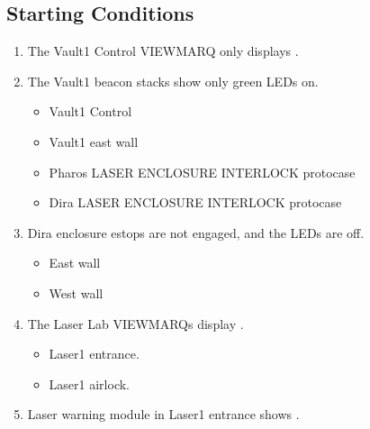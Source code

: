 \documentclass[letterpaper,10pt,english]{sphinxmanual}
\begin{document}
\subsection{Starting Conditions}
\label{\detokenize{testing_documentation/Laser-1:starting-conditions}}\begin{enumerate}
%
\item {} 
\sphinxAtStartPar
The Vault\sphinxhyphen{}1 Control VIEWMARQ only displays .

\item {} 
\sphinxAtStartPar
The Vault\sphinxhyphen{}1 beacon stacks show only green LEDs on.
\begin{itemize}
\item {} 
\sphinxAtStartPar
Vault\sphinxhyphen{}1 Control

\item {} 
\sphinxAtStartPar
Vault\sphinxhyphen{}1 east wall

\item {} 
\sphinxAtStartPar
Pharos LASER ENCLOSURE INTERLOCK protocase

\item {} 
\sphinxAtStartPar
Dira LASER ENCLOSURE INTERLOCK protocase

\end{itemize}

\item {} 
\sphinxAtStartPar
Dira enclosure e\sphinxhyphen{}stops are not engaged, and the LEDs are off.
\begin{itemize}
\item {} 
\sphinxAtStartPar
East wall

\item {} 
\sphinxAtStartPar
West wall

\end{itemize}

\item {} 
\sphinxAtStartPar
The Laser Lab VIEWMARQs display .
\begin{itemize}
\item {} 
\sphinxAtStartPar
Laser\sphinxhyphen{}1 entrance.

\item {} 
\sphinxAtStartPar
Laser\sphinxhyphen{}1 airlock.

\end{itemize}

\item {} 
\sphinxAtStartPar
Laser warning module in Laser\sphinxhyphen{}1 entrance shows .


\end{enumerate}
\end{document}
